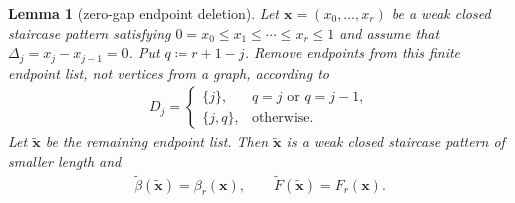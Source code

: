 \documentclass[10pt,a4paper]{article}
\newtheorem{lemma}[definition]{Lemma}
\begin{document}
\begin{lemma}[zero-gap endpoint deletion]\label{lem:zero-gap}
Let $\mathbf{x}=(x_0,\ldots,x_r)$ be a weak closed staircase pattern satisfying
$
  0=x_0\le x_1\le\cdots\le x_r\le1
$
and assume that $\Delta_j=x_j-x_{j-1}=0$.  Put $q\coloneqq r+1-j$.  Remove endpoints from this finite endpoint list, not vertices from a graph, according to
\begin{align}\label{eq:delete-rule}
  D_j=
  \begin{cases}
    \{j\},&q=j\text{ or }q=j-1,\\
    \{j,q\},&\text{otherwise}.
  \end{cases}
\end{align}
Let $\widetilde{\mathbf{x}}$ be the remaining endpoint list.  Then $\widetilde{\mathbf{x}}$ is a weak closed staircase pattern of smaller length and
\begin{align*}
  \widetilde \beta(\widetilde{\mathbf{x}})=\beta_r(\mathbf{x}),
  \qquad
  \widetilde F(\widetilde{\mathbf{x}})=F_r(\mathbf{x}).
\end{align*}
\end{lemma}
\end{document}
